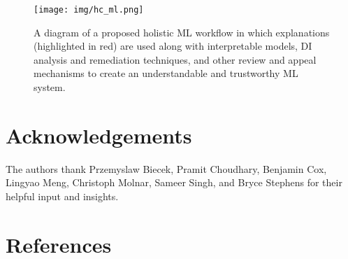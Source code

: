 \documentclass{article}
\begin{document}
\begin{figure}[htb!]
	\begin{center}
		\texttt{[image: img/hc\_ml.png]}
		\caption{A diagram of a proposed holistic ML workflow in which explanations (highlighted in red) are used along with interpretable models, DI analysis and remediation techniques, and other review and appeal mechanisms to create an understandable and trustworthy ML system.}
		\label{fig:hc_ml}
	\end{center}
\end{figure}

\clearpage
\section*{Acknowledgements}

The authors thank Przemyslaw Biecek, Pramit Choudhary, Benjamin Cox, Lingyao Meng, Christoph Molnar, Sameer Singh, and Bryce Stephens for their helpful input and insights. 

\section*{References}
\small


\end{document}
